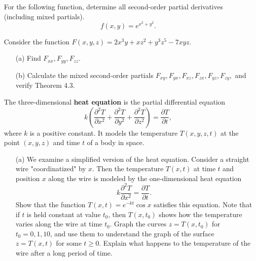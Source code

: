 \documentclass[11pt,letterpaper,boxed]{hmcpset}
\newcommand{\pn}[1]{\left( #1 \right)}
\newcommand{\pdr}[2]{\frac{\partial #1}{\partial #2}}
\newcommand{\pdrr}[2]{\frac{\partial^2 #1}{\partial #2^2}}
\begin{document}
\begin{solution}
\vfill
\end{solution}
\newpage

\begin{problem}[Colley 2.4 \#14]
For the following function, determine all second-order partial derivatives (including mixed partials).
\[
	f(x,y) = e^{{x^2}+{y^2}}.
\]
\end{problem}

\begin{solution}
\vfill
\end{solution}
\newpage

\begin{problem}[Colley 2.4 \#22]
Consider the function $F(x,y,z)=2x^3y+xz^2+y^3z^5-7xyz.$
\begin{enumerate}
\item[(a)] Find $F_{xx},F_{yy},F_{zz}$.
\item[(b)] Calculate the mixed second-order partials $F_{xy}, F_{yx}, F_{xz},
F_{zx}, F_{yz}, F_{zy},$ and verify Theorem 4.3.
\end{enumerate}
\end{problem}

\begin{solution}
\vfill
\end{solution}
\newpage

\begin{problem}[Colley 2.4 \#29a]
The three-dimensional \textbf{heat equation} is the partial differential equation
\[
	k\pn{\pdrr{T}{x}+\pdrr{T}{y}+\pdrr{T}{z}} = \pdr{T}{t},
\]
where $k$ is a positive constant. It models the temperature $T(x,y,z,t)$ at the point $(x,y,z)$ and time $t$
of a body in space.
\begin{enumerate}
\item[(a)] We examine a simplified version of the heat equation. Consider a straight wire "coordinatized" by $x$.
Then the temperature $T(x,t)$ at time $t$ and position $x$ along the wire is modeled by the one-dimensional heat equation
\[
	k\pdrr{T}{x} = \pdr{T}{t}.
\]
Show that the function $T(x,t) = e^{-kt}\cos{x}$ satisfies this equation. Note that if $t$ is held constant
at value $t_0$, then $T(x,t_0)$ shows how the temperature varies along the wire at time $t_0$. Graph the curves
$z=T(x,t_0)$ for $t_0=0,1,10$, and use them to understand the graph of the surface $z=T(x,t)$ for some
$t\geq 0$. Explain what happens to the temperature of the wire after a long period of time.
\end{enumerate}
\end{problem}

\begin{solution}
\vfill
\end{solution}
\newpage
\end{document}
